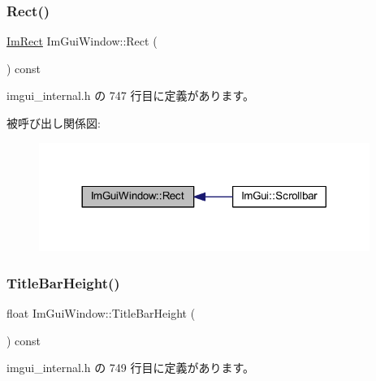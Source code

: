 \subsubsection{\texorpdfstring{Rect()}{Rect()}}
{\footnotesize\ttfamily \mbox{\hyperlink{struct_im_rect}{Im\+Rect}} Im\+Gui\+Window\+::\+Rect (\begin{DoxyParamCaption}{ }\end{DoxyParamCaption}) const\hspace{0.3cm}{\ttfamily [inline]}}



 imgui\+\_\+internal.\+h の 747 行目に定義があります。

被呼び出し関係図\+:\nopagebreak
\begin{figure}[H]
\begin{center}
\leavevmode
\includegraphics[width=305pt]{struct_im_gui_window_a147da28bf5d167cbe0a363c4a578dea1_icgraph}
\end{center}
\end{figure}
\mbox{\label{struct_im_gui_window_ad1580cc8b5bdf981c6ed2eb22ecd7dbb}} 
\subsubsection{\texorpdfstring{Title\+Bar\+Height()}{TitleBarHeight()}}
{\footnotesize\ttfamily float Im\+Gui\+Window\+::\+Title\+Bar\+Height (\begin{DoxyParamCaption}{ }\end{DoxyParamCaption}) const\hspace{0.3cm}{\ttfamily [inline]}}



 imgui\+\_\+internal.\+h の 749 行目に定義があります。

